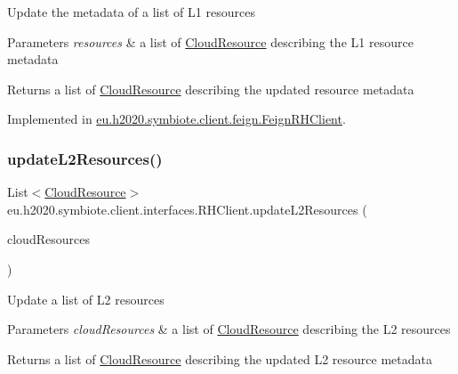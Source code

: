 Update the metadata of a list of L1 resources


\begin{DoxyParams}{Parameters}
{\em resources} & a list of \hyperlink{}{Cloud\+Resource} describing the L1 resource metadata \\
\hline
\end{DoxyParams}
\begin{DoxyReturn}{Returns}
a list of \hyperlink{}{Cloud\+Resource} describing the updated resource metadata 
\end{DoxyReturn}


Implemented in \hyperlink{classeu_1_1h2020_1_1symbiote_1_1client_1_1feign_1_1FeignRHClient_ab915fafbde1cb56c856abac918cc9de4}{eu.\+h2020.\+symbiote.\+client.\+feign.\+Feign\+R\+H\+Client}.

\mbox{\label{interfaceeu_1_1h2020_1_1symbiote_1_1client_1_1interfaces_1_1RHClient_a4db8d3650014ed2c178e5be03da8ac63}} 
\subsubsection{\texorpdfstring{update\+L2\+Resources()}{updateL2Resources()}}
{\footnotesize\ttfamily List$<$\hyperlink{classeu_1_1h2020_1_1symbiote_1_1cloud_1_1model_1_1internal_1_1CloudResource}{Cloud\+Resource}$>$ eu.\+h2020.\+symbiote.\+client.\+interfaces.\+R\+H\+Client.\+update\+L2\+Resources (\begin{DoxyParamCaption}\item[{List$<$ \hyperlink{classeu_1_1h2020_1_1symbiote_1_1cloud_1_1model_1_1internal_1_1CloudResource}{Cloud\+Resource} $>$}]{cloud\+Resources }\end{DoxyParamCaption})}

Update a list of L2 resources


\begin{DoxyParams}{Parameters}
{\em cloud\+Resources} & a list of \hyperlink{}{Cloud\+Resource} describing the L2 resources \\
\hline
\end{DoxyParams}
\begin{DoxyReturn}{Returns}
a list of \hyperlink{}{Cloud\+Resource} describing the updated L2 resource metadata 
\end{DoxyReturn}


